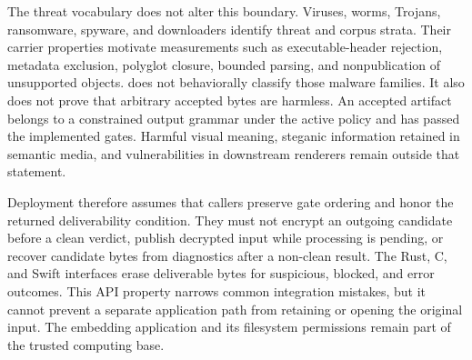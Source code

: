 The threat vocabulary does not alter this boundary. Viruses, worms, Trojans,
ransomware, spyware, and downloaders identify threat and corpus strata. Their
carrier properties motivate measurements such as executable-header rejection,
metadata exclusion, polyglot closure, bounded parsing, and nonpublication of
unsupported objects. \AFD{} does not behaviorally classify those malware
families. It also does not prove that arbitrary accepted bytes are harmless.
An accepted artifact belongs to a constrained output grammar under the active
policy and has passed the implemented gates. Harmful visual meaning, steganic
information retained in semantic media, and vulnerabilities in downstream
renderers remain outside that statement.

Deployment therefore assumes that callers preserve gate ordering and honor
the returned deliverability condition. They must not encrypt an outgoing
candidate before a clean verdict, publish decrypted input while processing is
pending, or recover candidate bytes from diagnostics after a non-clean result.
The Rust, C, and Swift interfaces erase deliverable bytes for suspicious,
blocked, and error outcomes. This API property narrows common integration
mistakes, but it cannot prevent a separate application path from retaining or
opening the original input. The embedding application and its filesystem
permissions remain part of the trusted computing base.
